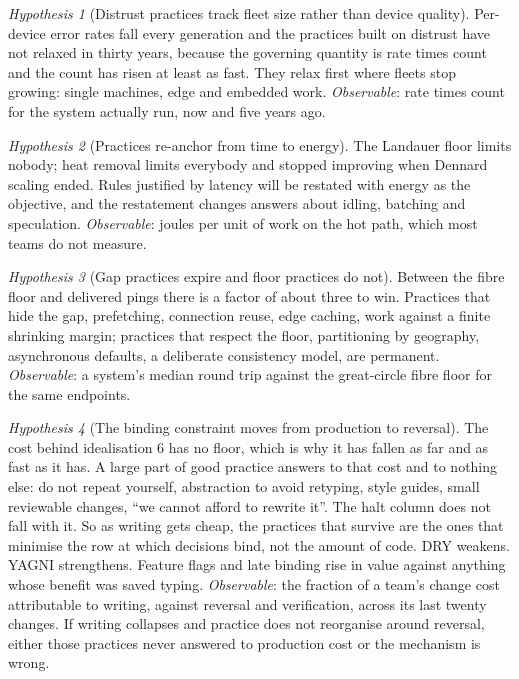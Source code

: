 \documentclass[11pt,oneside]{article}
\theoremstyle{definition}
\theoremstyle{remark}
\newtheorem{hyp}{Hypothesis}
\begin{document}
\begin{hyp}[Distrust practices track fleet size rather than device quality]
Per-device error rates fall every generation and the practices built on distrust have not
relaxed in thirty years, because the governing quantity is rate times count and the count
has risen at least as fast. They relax first where fleets stop growing: single machines,
edge and embedded work. \emph{Observable}: rate times count for the system actually run,
now and five years ago.
\end{hyp}

\begin{hyp}[Practices re-anchor from time to energy]
The Landauer floor limits nobody; heat removal limits everybody and stopped improving when
Dennard scaling ended. Rules justified by latency will be restated with energy as the
objective, and the restatement changes answers about idling, batching and speculation.
\emph{Observable}: joules per unit of work on the hot path, which most teams do not
measure.
\end{hyp}

\begin{hyp}[Gap practices expire and floor practices do not]
Between the fibre floor and delivered pings there is a factor of about three to win.
Practices that hide the gap, prefetching, connection reuse, edge caching, work against a
finite shrinking margin; practices that respect the floor, partitioning by geography,
asynchronous defaults, a deliberate consistency model, are permanent. \emph{Observable}: a
system's median round trip against the great-circle fibre floor for the same endpoints.
\end{hyp}

\begin{hyp}[The binding constraint moves from production to reversal]
The cost behind idealisation 6 has no floor, which is why it has fallen as far and as fast
as it has. A large part of good practice answers to that cost and to nothing else: do not
repeat yourself, abstraction to avoid retyping, style guides, small reviewable changes,
``we cannot afford to rewrite it''. The halt column does not fall with it. So as writing
gets cheap, the practices that survive are the ones that minimise the row at which
decisions bind, not the amount of code. DRY weakens. YAGNI strengthens. Feature flags and
late binding rise in value against anything whose benefit was saved typing. \emph{Observable}: the fraction of a team's change
cost attributable to writing, against reversal and verification, across its last twenty
changes. If writing collapses and practice does not reorganise around reversal, either
those practices never answered to production cost or the mechanism is wrong.
\end{hyp}
\end{document}
